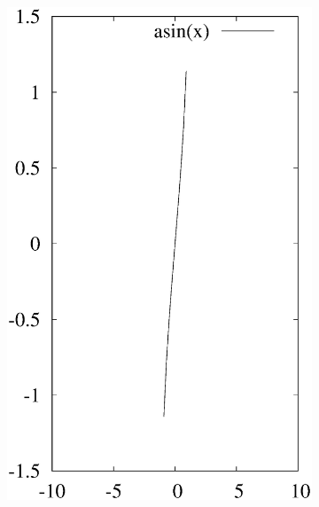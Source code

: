 \documentclass[journal=jacsat,manuscript=article]{achemso}
\begin{document}
\begin{figure}[ht]
\begin{subfigure}{0.3\textwidth}
\includegraphics [width=\textwidth]{asin.eps}

\end{subfigure}
\end{figure}
\end{document}

